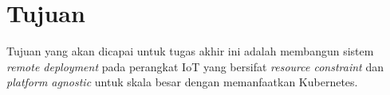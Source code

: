 \section{Tujuan}

Tujuan yang akan dicapai untuk tugas akhir ini adalah membangun sistem \textit{remote deployment} pada perangkat IoT yang bersifat \textit{resource constraint} dan \textit{platform agnostic} untuk skala besar dengan memanfaatkan Kubernetes.
